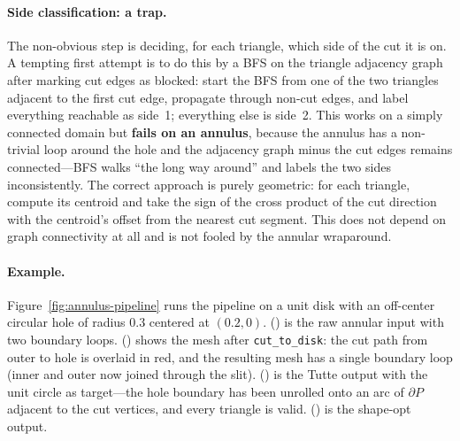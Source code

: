 \documentclass[11pt]{article}
\begin{document}
\paragraph{Side classification: a trap.}
The non-obvious step is deciding, for each triangle, which side of
the cut it is on. A tempting first attempt is to do this by a BFS
on the triangle adjacency graph after marking cut edges as blocked:
start the BFS from one of the two triangles adjacent to the first
cut edge, propagate through non-cut edges, and label everything
reachable as side~1; everything else is side~2. This works on a
simply connected domain but \textbf{fails on an annulus}, because
the annulus has a non-trivial loop around the hole and the
adjacency graph minus the cut edges remains connected---BFS walks
``the long way around'' and labels the two sides inconsistently.
The correct approach is purely geometric: for each triangle,
compute its centroid and take the sign of the cross product of the
cut direction with the centroid's offset from the nearest cut
segment. This does not depend on graph connectivity at all and is
not fooled by the annular wraparound.

\paragraph{Example.}
Figure~\ref{fig:annulus-pipeline} runs the pipeline on a unit disk
with an off-center circular hole of radius $0.3$ centered at
$(0.2, 0)$. () is the raw annular input
with two boundary loops. () shows the
mesh after \texttt{cut\_to\_disk}: the cut path from outer to hole
is overlaid in red, and the resulting mesh has a single boundary
loop (inner and outer now joined through the slit).
() is the Tutte output with the unit
circle as target---the hole boundary has been unrolled onto an arc
of $\partial P$ adjacent to the cut vertices, and every triangle
is valid. () is the shape-opt output.
\end{document}
